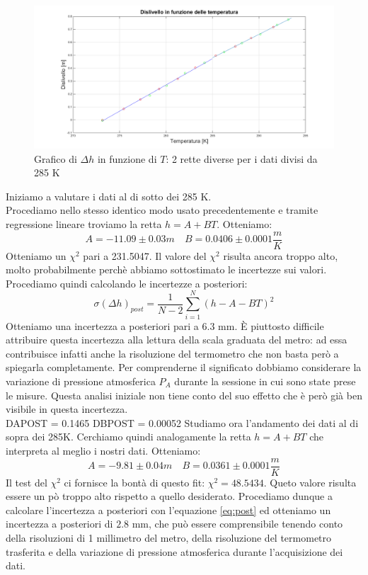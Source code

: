 \begin{figure}[H]
\centering
\includegraphics[width=\textwidth]{img/2}
\caption{Grafico di $\Delta h$ in funzione di $T$: 2 rette diverse per i dati divisi da 285 K}
\end{figure}

Iniziamo a valutare i dati al di sotto dei 285 K.\\
Procediamo nello stesso identico modo usato precedentemente e tramite regressione lineare troviamo la retta $h = A+BT$.
Otteniamo:
\[A = -11.09 \pm 0.03 m \quad  B = 0.0406\pm 0.0001 \frac{m}{K}\]
Otteniamo un $\chi^2$ pari a 231.5047. 
Il valore del $\chi^2$ risulta ancora troppo alto, molto probabilmente perchè abbiamo sottostimato le incertezze sui valori.
Procediamo quindi calcolando le incertezze a posteriori:
\begin{equation}
\label{eq:post}
\sigma(\Delta h)_{post} = \frac{1}{N-2}\sum_{i=1}^N(h-A-BT)^2
\end{equation}
Otteniamo una incertezza a posteriori pari a $6.3$ mm. 
È piuttosto difficile attribuire questa incertezza alla lettura della scala graduata del metro: ad essa contribuisce infatti anche la risoluzione del termometro che non basta però a spiegarla completamente. 
Per comprenderne il significato dobbiamo considerare la variazione di pressione atmosferica $P_A$ durante la sessione in cui sono state prese le misure. 
Questa analisi iniziale non tiene conto del suo effetto che è però già ben visibile in questa incertezza.\\
DAPOST = 0.1465
DBPOST = 0.00052
\newline
Studiamo ora l'andamento dei dati al di sopra dei 285K. 
Cerchiamo quindi analogamente la retta $h = A+BT$ che interpreta al meglio i nostri dati. 
Otteniamo:
\[A = -9.81 \pm 0.04 m \quad  B = 0.0361 \pm 0.0001 \frac{m}{K}\]
Il test del $\chi^2$ ci fornisce la bontà di questo fit: $\chi^2 = 48.5434$. 
Queto valore risulta essere un pò troppo alto rispetto a quello desiderato. 
Procediamo dunque a calcolare l'incertezza a posteriori con l'equazione \eqref{eq:post} ed otteniamo un incertezza a posteriori di $2.8$ mm, che può essere comprensibile tenendo conto della risoluzioni di 1 millimetro del metro, della risoluzione del termometro trasferita e della variazione di pressione atmosferica durante l'acquisizione dei dati.

